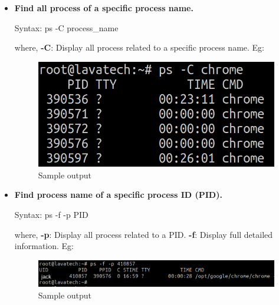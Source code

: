 \begin{flushleft}
\begin{itemize}
\begin{itemize}
		
		\item \textbf{Find all process of a specific process name.}
		\bigskip
		\begin{tcolorbox}[breakable,notitle,boxrule=-0pt,colback=pink,colframe=pink]
			\color{black}
			\font=9pt
			Syntax: ps -C process\_name
			\font=4pt
		\end{tcolorbox}	
		where,
		\newline
		\textbf{-C}: Display all process related to a specific process name.
		\newline
		Eg:
		\begin{figure}[h!]
			\centering
			\includegraphics[scale=.4]{content/chapter12/images/ps_u.png}
			\caption{Sample output}
			\label{fig:process23454}
		\end{figure}
			
		\bigskip
		\bigskip
		
		\item \textbf{Find process name of a specific process ID (PID).}
		\bigskip
		\begin{tcolorbox}[breakable,notitle,boxrule=-0pt,colback=pink,colframe=pink]
			\color{black}
			\font=9pt
			Syntax: ps -f -p  PID
			\font=4pt
		\end{tcolorbox}	
		where,
		\newline
		\textbf{-p}: Display all process related to a PID.
		\newline
		\textbf{-f}: Display full detailed information.
		\newline
		Eg:
		\begin{figure}[h!]
			\centering
			\includegraphics[scale=.3]{content/chapter12/images/ps_p.png}
			\caption{Sample output}
			\label{fig:process234549}
		\end{figure}
							

\end{itemize}
\end{itemize}
\end{flushleft}
